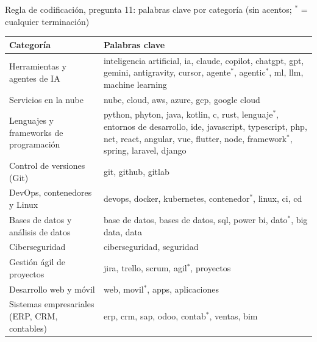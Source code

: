 \begin{mitabla}{Regla de codificación, pregunta 11: palabras clave por categoría (sin acentos; $^{*}$ = cualquier terminación)}
\begin{tabular}{L{5.2cm}L{9.4cm}}
\toprule
Categoría & Palabras clave \\
\midrule
Herramientas y agentes de IA & inteligencia artificial, ia, claude, copilot, chatgpt, gpt, gemini, antigravity, cursor, agente$^{*}$, agentic$^{*}$, ml, llm, machine learning \\
Servicios en la nube & nube, cloud, aws, azure, gcp, google cloud \\
Lenguajes y frameworks de programación & python, phyton, java, kotlin, c, rust, lenguaje$^{*}$, entornos de desarrollo, ide, javascript, typescript, php, net, react, angular, vue, flutter, node, framework$^{*}$, spring, laravel, django \\
Control de versiones (Git) & git, github, gitlab \\
DevOps, contenedores y Linux & devops, docker, kubernetes, contenedor$^{*}$, linux, ci, cd \\
Bases de datos y análisis de datos & base de datos, bases de datos, sql, power bi, dato$^{*}$, big data, data \\
Ciberseguridad & ciberseguridad, seguridad \\
Gestión ágil de proyectos & jira, trello, scrum, agil$^{*}$, proyectos \\
Desarrollo web y móvil & web, movil$^{*}$, apps, aplicaciones \\
Sistemas empresariales (ERP, CRM, contables) & erp, crm, sap, odoo, contab$^{*}$, ventas, bim \\
\bottomrule
\end{tabular}
\end{mitabla}


